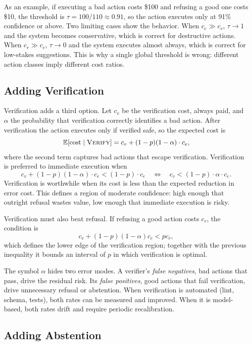 \documentclass[11pt]{book}
\begin{document}
As an example, if executing a bad action costs \$100 and refusing a good one costs \$10, the threshold is $\tau = 100/110 \approx 0.91$, so the action executes only at 91\% confidence or above. Two limiting cases show the behavior. When $c_e \gg c_r$, $\tau \rightarrow 1$ and the system becomes conservative, which is correct for destructive actions. When $c_r \gg c_e$, $\tau \rightarrow 0$ and the system executes almost always, which is correct for low-stakes suggestions. This is why a single global threshold is wrong: different action classes imply different cost ratios.

\subsection{Adding Verification}

Verification adds a third option. Let $c_v$ be the verification cost, always paid, and $\alpha$ the probability that verification correctly identifies a bad action. After verification the action executes only if verified safe, so the expected cost is
\[
\mathbb{E}[\text{cost} \mid \textsc{Verify}] = c_v + (1-p)(1-\alpha) \cdot c_e,
\]
where the second term captures bad actions that escape verification. Verification is preferred to immediate execution when
\[
c_v + (1-p)(1-\alpha) \cdot c_e < (1-p) \cdot c_e \quad \Longleftrightarrow \quad c_v < (1-p) \cdot \alpha \cdot c_e.
\]
Verification is worthwhile when its cost is less than the expected reduction in error cost. This defines a region of moderate confidence: high enough that outright refusal wastes value, low enough that immediate execution is risky.

Verification must also beat refusal. If refusing a good action costs $c_r$, the condition is
\[
c_v + (1-p)(1-\alpha)c_e < p c_r,
\]
which defines the lower edge of the verification region; together with the previous inequality it bounds an interval of $p$ in which verification is optimal.

The symbol $\alpha$ hides two error modes. A verifier's \textit{false negatives}, bad actions that pass, drive the residual risk. Its \textit{false positives}, good actions that fail verification, drive unnecessary refusal or abstention. When verification is automated (lint, schema, tests), both rates can be measured and improved. When it is model-based, both rates drift and require periodic recalibration.

\subsection{Adding Abstention}
\end{document}
